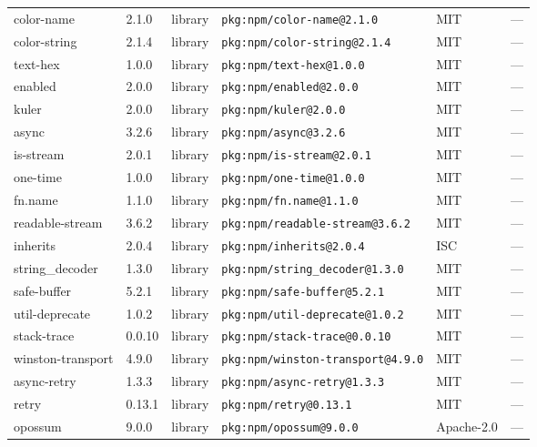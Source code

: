 \documentclass[11pt,a4paper]{article}
\begin{document}
\begin{longtable}{|p{4cm}|p{2cm}|p{1.6cm}|p{5cm}|p{1.5cm}|p{3.5cm}|}
\raggedright color-name & 2.1.0 & library & \small\texttt{pkg:npm/color-name@2.1.0} & MIT & \small — \\
\raggedright color-string & 2.1.4 & library & \small\texttt{pkg:npm/color-string@2.1.4} & MIT & \small — \\
\raggedright text-hex & 1.0.0 & library & \small\texttt{pkg:npm/text-hex@1.0.0} & MIT & \small — \\
\raggedright enabled & 2.0.0 & library & \small\texttt{pkg:npm/enabled@2.0.0} & MIT & \small — \\
\raggedright kuler & 2.0.0 & library & \small\texttt{pkg:npm/kuler@2.0.0} & MIT & \small — \\
\raggedright async & 3.2.6 & library & \small\texttt{pkg:npm/async@3.2.6} & MIT & \small — \\
\raggedright is-stream & 2.0.1 & library & \small\texttt{pkg:npm/is-stream@2.0.1} & MIT & \small — \\
\raggedright one-time & 1.0.0 & library & \small\texttt{pkg:npm/one-time@1.0.0} & MIT & \small — \\
\raggedright fn.name & 1.1.0 & library & \small\texttt{pkg:npm/fn.name@1.1.0} & MIT & \small — \\
\raggedright readable-stream & 3.6.2 & library & \small\texttt{pkg:npm/readable-stream@3.6.2} & MIT & \small — \\
\raggedright inherits & 2.0.4 & library & \small\texttt{pkg:npm/inherits@2.0.4} & ISC & \small — \\
\raggedright string\_decoder & 1.3.0 & library & \small\texttt{pkg:npm/string\_decoder@1.3.0} & MIT & \small — \\
\raggedright safe-buffer & 5.2.1 & library & \small\texttt{pkg:npm/safe-buffer@5.2.1} & MIT & \small — \\
\raggedright util-deprecate & 1.0.2 & library & \small\texttt{pkg:npm/util-deprecate@1.0.2} & MIT & \small — \\
\raggedright stack-trace & 0.0.10 & library & \small\texttt{pkg:npm/stack-trace@0.0.10} & MIT & \small — \\
\raggedright winston-transport & 4.9.0 & library & \small\texttt{pkg:npm/winston-transport@4.9.0} & MIT & \small — \\
\raggedright async-retry & 1.3.3 & library & \small\texttt{pkg:npm/async-retry@1.3.3} & MIT & \small — \\
\raggedright retry & 0.13.1 & library & \small\texttt{pkg:npm/retry@0.13.1} & MIT & \small — \\
\raggedright opossum & 9.0.0 & library & \small\texttt{pkg:npm/opossum@9.0.0} & Apache-2.0 & \small — \\

\end{longtable}
\end{document}
